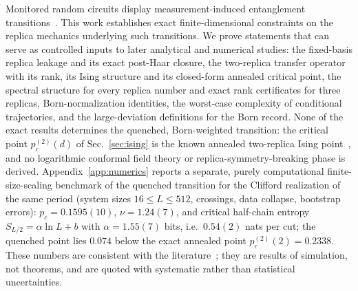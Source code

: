 \documentclass[aps,prx,reprint,superscriptaddress,nobibnotes,longbibliography]{revtex4-2}
\theoremstyle{remark}
\begin{document}
Monitored random circuits display measurement-induced entanglement transitions~\cite{Li2018,Skinner2019,Chan2019,Gullans2020,Choi2020,Vasseur2019,Jian2020,Bao2020}.  This work establishes exact finite-dimensional constraints on the replica mechanics underlying such transitions.  We prove statements that can serve as controlled inputs to later analytical and numerical studies: the fixed-basis replica leakage and its exact post-Haar closure, the two-replica transfer operator with its rank, its Ising structure and its closed-form annealed critical point, the spectral structure for every replica number and exact rank certificates for three replicas, Born-normalization identities, the worst-case complexity of conditional trajectories, and the large-deviation definitions for the Born record.  None of the exact results determines the quenched, Born-weighted transition: the critical point $p_c^{(2)}(d)$ of Sec.~\ref{sec:ising} is the known annealed two-replica Ising point~\cite{Bao2020,Houtappel1950}, and no logarithmic conformal field theory or replica-symmetry-breaking phase is derived.  Appendix~\ref{app:numerics} reports a separate, purely computational finite-size-scaling benchmark of the quenched transition for the Clifford realization of the same period (system sizes $16\le L\le512$, crossings, data collapse, bootstrap errors): $p_c=0.1595(10)$, $\nu=1.24(7)$, and critical half-chain entropy $S_{L/2}=\alpha\ln L+b$ with $\alpha=1.55(7)$ bits, i.e.\ $0.54(2)$ nats per cut; the quenched point lies $0.074$ below the exact annealed point $p_c^{(2)}(2)=0.2338$.  These numbers are consistent with the literature~\cite{Li2019,Zabalo2020,Sierant2022}; they are results of simulation, not theorems, and are quoted with systematic rather than statistical uncertainties.
\end{document}
